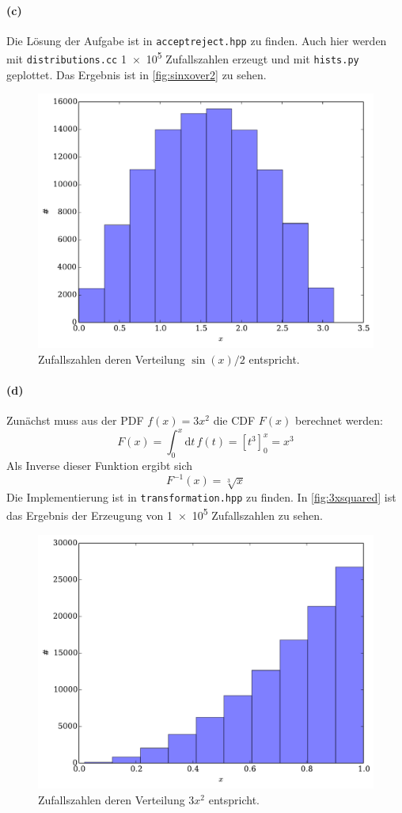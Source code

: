 \documentclass{scrartcl}
\begin{document}
\paragraph{(c)} Die Lösung der Aufgabe ist in \texttt{acceptreject.hpp} zu finden. Auch hier werden mit \texttt{distributions.cc} \num{1e5} Zufallszahlen erzeugt und mit \texttt{hists.py} geplottet. Das Ergebnis ist in \autoref{fig:sinxover2} zu sehen.

\begin{figure}[H]
    \centering
    \includegraphics[width=.5\textwidth]{plots/sinxover2.pdf}
    \caption{Zufallszahlen deren Verteilung $\sin(x)/2$ entspricht.}
    \label{fig:sinxover2}
\end{figure}

\paragraph{(d)} Zunächst muss aus der PDF $f(x) = 3x^2$ die CDF $F(x)$ berechnet werden:
\begin{equation}
    F(x) = \int_0^x\mathrm{d}t\,f(t) = \left[t^3\right]_0^x = x^3
\end{equation}
Als Inverse dieser Funktion ergibt sich
\begin{equation}
    F^{-1}(x) = \sqrt[3]{x}
\end{equation}
Die Implementierung ist in \texttt{transformation.hpp} zu finden. In \autoref{fig:3xsquared} ist das Ergebnis der Erzeugung von \num{1e5} Zufallszahlen zu sehen.

\begin{figure}[H]
    \centering
    \includegraphics[width=.5\textwidth]{plots/3xsquared.pdf}
    \caption{Zufallszahlen deren Verteilung $3x^2$ entspricht.}
    \label{fig:3xsquared}
\end{figure}
\end{document}
